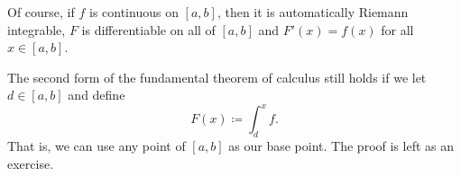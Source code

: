 Of course, if $f$ is continuous on $[a,b]$, then it is automatically Riemann
integrable, $F$ is differentiable on all of $[a,b]$ and $F'(x) = f(x)$ for
all $x \in [a,b]$.

\begin{remark} \label{remark:fundthmbase}
The second form of the fundamental theorem of calculus still holds if
we let $d \in [a,b]$ and define
\begin{equation*}
F(x) \coloneqq \int_d^x f .
\end{equation*}
That is, we can use any point of $[a,b]$ as our base point.  The proof is
left as an exercise.
\end{remark}

